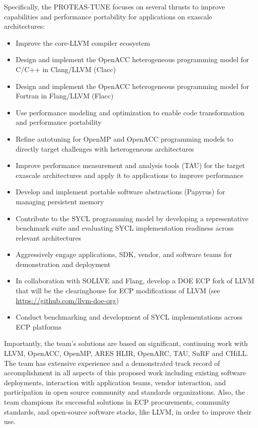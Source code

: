 Specifically, the PROTEAS-TUNE focuses on several thrusts to improve capabilities and performance portability for applications on exascale architectures: 

\begin{itemize}
\item 
    Improve the core-LLVM compiler ecosystem 
\item 
	Design and implement the OpenACC heterogeneous programming model for C/C++ in Clang/LLVM (Clacc)
\item 
    Design and implement the OpenACC heterogeneous programming model for Fortran in Flang/LLVM (Flacc)  
    
\item 
	Use performance modeling and optimization to enable code transformation and performance portability
\item 
	Refine autotuning for OpenMP and OpenACC programming models to directly target challenges with heterogeneous architectures
\item 
    Improve performance measurement and analysis tools (TAU) for the target exascale architectures and apply it to applications to improve performance
\item 
    Develop and implement portable software abstractions (Papyrus) for managing persistent memory
\item 
    Contribute to the SYCL programming model by developing a representative benchmark suite and evaluating SYCL implementation readiness across relevant architectures
\item 
    Aggressively engage applications, SDK, vendor, and software teams for demonstration and deployment
\item
    In collaboration with SOLLVE and Flang, develop a DOE ECP fork of LLVM that will be the clearinghouse for ECP modifications of LLVM  (see \url{https://github.com/llvm-doe-org})
\item
    Conduct benchmarking and development of SYCL implementations across ECP platforms
    
\end{itemize}

Importantly, the team’s solutions are based on significant, continuing work with LLVM, OpenACC, OpenMP, ARES HLIR, OpenARC, TAU, SuRF and CHiLL. 
The team has extensive experience and a demonstrated track record of accomplishment in all aspects of this proposed work including existing software deployments, interaction with application teams, vendor interaction, and participation in open source community and standards organizations. 
Also, the team champions its successful solutions in ECP procurements, community standards, and open-source software stacks, like LLVM, in order to improve their use.

